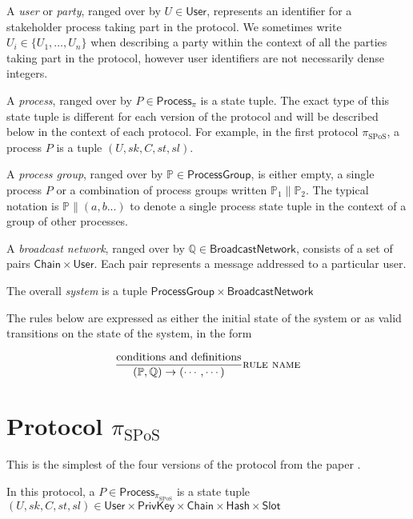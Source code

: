 \documentclass[12pt]{article}
\newcommand{\sPar}{\mathrel{\parallel}}
\newcommand{\sSystem}[2]{\left( #1, #2 \right)}
\newcommand{\sProcess}[3]{\left( U, sk, #1, #2, #3 \right)}
\newcommand{\sChain}{C}
\newcommand{\sState}{st}
\newcommand{\sSlot}{sl}
\newcommand{\sQueue}{\mathbb{Q}}
\newcommand{\sProcesses}{\mathbb{P}}
\begin{document}
A \emph{user} or \emph{party}, ranged over by $U \in \mathsf{User}$,
represents an identifier for a stakeholder process taking part in the
protocol. We sometimes write $U_i \in \{U_1, \ldots, U_n \}$ when describing
a party within the context of all the parties taking part in the protocol,
however user identifiers are not necessarily dense integers.

A \emph{process}, ranged over by $P \in \mathsf{Process}_\pi$ is a
state tuple. The exact type of this state tuple is different for each version
of the protocol and will be described below in the context of each protocol.
For example, in the first protocol $\pi_{\text{SPoS}}$, a process
$P$ is a tuple $\sProcess{\sChain}{\sState}{\sSlot}$.

A \emph{process group}, ranged over by $\mathbb{P} \in \mathsf{ProcessGroup}$,
is either empty, a single process $P$ or a combination of process
groups written $\mathbb{P}_1 \sPar \mathbb{P}_2$. The typical notation is
$\sProcesses \sPar ( a, b ... )$ to denote a single process state
tuple in the context of a group of other processes.

A \emph{broadcast network}, ranged over by $\sQueue \in \mathsf{BroadcastNetwork}$, consists of a set of pairs $\mathsf{Chain} \times \mathsf{User}$.
Each pair represents a message addressed to a particular user.

The overall \emph{system} is a tuple $\mathsf{ProcessGroup} \times \mathsf{BroadcastNetwork}$

The rules below are expressed as either the initial state of the system or
as valid transitions on the state of the system, in the form

\begin{equation*}
\frac{
  \text{conditions and definitions}
}{
  \sSystem{ \sProcesses }{ \sQueue }
\rightarrow
  \sSystem{ \cdots }{ \cdots }
} \textsc{rule name}
\end{equation*}

\section{Protocol $\pi_{\text{SPoS}}$}

This is the simplest of the four versions of the protocol from the paper
\citep{ouroboros}.

In this protocol, a $P \in \mathsf{Process}_{\pi_{\text{SPoS}}}$ is
a state tuple $\sProcess{\sChain}{\sState}{\sSlot} \in 
\mathsf{User} \times \mathsf{PrivKey} \times \mathsf{Chain} \times \mathsf{Hash} \times \mathsf{Slot}$
\end{document}

